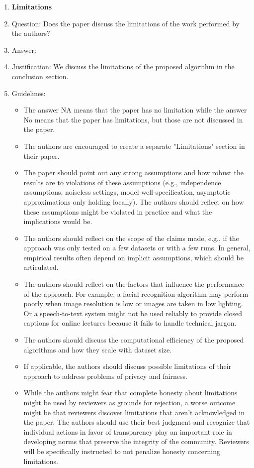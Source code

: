 \documentclass{article}
\theoremstyle{remark}
\begin{document}
\begin{enumerate}
\item {\bf Limitations}
    \item[] Question: Does the paper discuss the limitations of the work performed by the authors?
    \item[] Answer: \answerYes{} %
    \item[] Justification: We discuss the limitations of the proposed algorithm in the conclusion section.
    \item[] Guidelines:
    \begin{itemize}
        \item The answer NA means that the paper has no limitation while the answer No means that the paper has limitations, but those are not discussed in the paper. 
        \item The authors are encouraged to create a separate "Limitations" section in their paper.
        \item The paper should point out any strong assumptions and how robust the results are to violations of these assumptions (e.g., independence assumptions, noiseless settings, model well-specification, asymptotic approximations only holding locally). The authors should reflect on how these assumptions might be violated in practice and what the implications would be.
        \item The authors should reflect on the scope of the claims made, e.g., if the approach was only tested on a few datasets or with a few runs. In general, empirical results often depend on implicit assumptions, which should be articulated.
        \item The authors should reflect on the factors that influence the performance of the approach. For example, a facial recognition algorithm may perform poorly when image resolution is low or images are taken in low lighting. Or a speech-to-text system might not be used reliably to provide closed captions for online lectures because it fails to handle technical jargon.
        \item The authors should discuss the computational efficiency of the proposed algorithms and how they scale with dataset size.
        \item If applicable, the authors should discuss possible limitations of their approach to address problems of privacy and fairness.
        \item While the authors might fear that complete honesty about limitations might be used by reviewers as grounds for rejection, a worse outcome might be that reviewers discover limitations that aren't acknowledged in the paper. The authors should use their best judgment and recognize that individual actions in favor of transparency play an important role in developing norms that preserve the integrity of the community. Reviewers will be specifically instructed to not penalize honesty concerning limitations.
    \end{itemize}


\end{enumerate}
\end{document}
